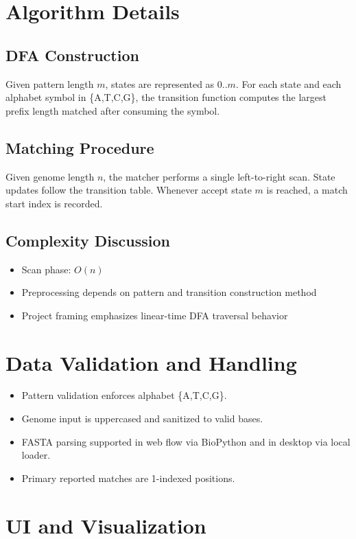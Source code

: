 \documentclass[11pt]{article}
\begin{document}
\section{Algorithm Details}
\subsection{DFA Construction}
Given pattern length $m$, states are represented as $0..m$. For each state and each alphabet symbol in \{A,T,C,G\}, the transition function computes the largest prefix length matched after consuming the symbol.

\subsection{Matching Procedure}
Given genome length $n$, the matcher performs a single left-to-right scan. State updates follow the transition table. Whenever accept state $m$ is reached, a match start index is recorded.

\subsection{Complexity Discussion}
\begin{itemize}[leftmargin=*]
  \item Scan phase: $O(n)$
  \item Preprocessing depends on pattern and transition construction method
  \item Project framing emphasizes linear-time DFA traversal behavior
\end{itemize}

\section{Data Validation and Handling}
\begin{itemize}[leftmargin=*]
  \item Pattern validation enforces alphabet \{A,T,C,G\}.
  \item Genome input is uppercased and sanitized to valid bases.
  \item FASTA parsing supported in web flow via BioPython and in desktop via local loader.
  \item Primary reported matches are 1-indexed positions.
\end{itemize}

\section{UI and Visualization}
\end{document}
